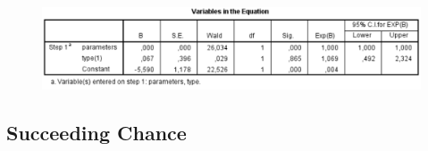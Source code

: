 \documentclass[14]{article}
\begin{document}
\begin{figure}[!htb]
	\includegraphics[width=1.0\textwidth]{img/question4/question4_variables.PNG}
	\captionsetup{width=1.0\textwidth}
	\centering 
\end{figure}

\subsection{Succeeding Chance}
\end{document}
